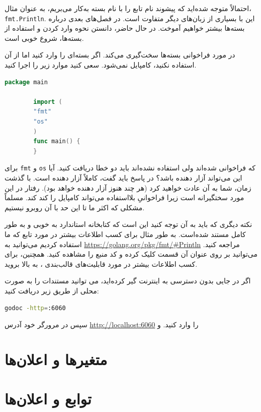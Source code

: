 \documentclass{book}
\begin{document}
احتمالاً متوجه شده‌اید که پیشوند نام تابع را با نام بسته به‌کار می‌بریم، به عنوان مثال، \verb*|fmt.Println|. این با بسیاری از زبان‌های دیگر متفاوت است. در فصل‌های بعدی درباره بسته‌ها بیشتر خواهیم آموخت. در حال حاضر، دانستن نحوه وارد کردن و استفاده از بسته‌ها، شروع خوبی است.

در مورد فراخوانی بسته‌ها سخت‌گیری می‌کند. اگر بسته‌ای را وارد کنید اما از آن استفاده نکنید، کامپایل نمی‌شود. سعی کنید موارد زیر را اجرا کنید.

\begin{latin}
	\begin{lstlisting}[language=Go]
		package main
		
		import (
		"fmt"
		"os"
		)
		func main() {
		}
	\end{lstlisting}
\end{latin}
برای \verb*|fmt| و \verb*|os| که فراخوانی شده‌اند ولی استفاده نشده‌اند باید دو خطا دریافت کنید. آیا این می‌تواند آزار دهنده باشد؟ در  پاسخ باید گفت، کاملاً  آزار دهنده است. با گذشت زمان، شما به آن عادت خواهید کرد (هر چند هنوز آزار دهنده خواهد بود).
رفتار  
 در این مورد سختگیرانه است زیرا فراخوانیِ بلااستفاده می‌تواند کامپایل را کند کند. مسلماً مشکلی که اکثر ما تا این حد با آن روبرو نیستیم. 
 
 نکته دیگری که باید به آن توجه کنید این است که کتابخانه استاندارد  به خوبی و به طور کامل مستند شده‌است. به طور مثال برای کسب اطلاعات بیشتر در مورد تابع  که ما استفاده کردیم می‌توانید به \url{https://golang.org/pkg/fmt/#Println} مراجعه کنید. می‌توانید بر روی عنوان آن قسمت کلیک کرده و کد منبع را مشاهده کنید. همچنین، برای کسب اطلاعات بیشتر در مورد قابلیت‌های قالب‌بندی ، به بالا بروید.
 
اگر در جایی بدون دسترسی به اینترنت گیر کرده‌اید، می توانید مستندات را به صورت محلی از طریق زیر دریافت کنید:
\begin{latin}
	\begin{lstlisting}[language=bash]
	godoc -http=:6060
	\end{lstlisting}
\end{latin}
سپس در مرورگر خود آدرس  \url{http://localhost:6060} را وارد کنید. و 
 
\newpage
\section{متغیرها و اعلان‌ها}

\newpage
\section{توابع و اعلان‌ها}
\end{document}
